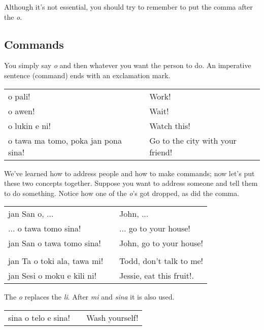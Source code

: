 Although it's not essential, you should try to remember to put the comma after the \textit{o}. 

%
\subsection*{Commands}
%
You simply say \textit{o} and then whatever you want the person to do. 
An imperative sentence (command) ends with an exclamation mark.

\begin{supertabular}{p{5,5cm}|ll}
o pali! && Work! \\
o awen! && Wait! \\
o lukin e ni! && Watch this! \\
o tawa ma tomo, poka jan pona sina! && Go to the city with your friend! \\
\end{supertabular} 

We've learned how to address people and how to make commands; now let's put these two concepts together. 
Suppose you want to address someone and tell them to do something. 
Notice how one of the \textit{o}'s got dropped, as did the comma. 

\begin{supertabular}{p{5,5cm}|ll}
jan San o, ...  && John, ... \\
 ... o tawa tomo sina! && ... go to your house! \\
jan San o tawa tomo sina!  && John, go to your house! \\
 && \\ %
jan Ta o toki ala, tawa mi! && Todd, don't talk to me! \\
jan Sesi o moku e kili ni! && Jessie, eat this fruit!. \\
\end{supertabular} 

The \textit{o} replaces the \textit{li}. After \textit{mi}  and \textit{sina} it is also used.

\begin{supertabular}{p{5,5cm}|ll}
sina o telo e sina! && Wash yourself! \\
\end{supertabular} 

